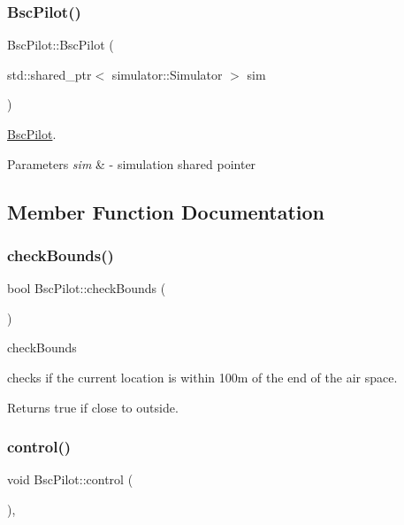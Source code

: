 \subsubsection{\texorpdfstring{Bsc\+Pilot()}{BscPilot()}}
{\footnotesize\ttfamily Bsc\+Pilot\+::\+Bsc\+Pilot (\begin{DoxyParamCaption}\item[{std\+::shared\+\_\+ptr$<$ simulator\+::\+Simulator $>$}]{sim }\end{DoxyParamCaption})}



\hyperlink{classBscPilot}{Bsc\+Pilot}. 


\begin{DoxyParams}{Parameters}
{\em sim} & -\/ simulation shared pointer \\
\hline
\end{DoxyParams}


\subsection{Member Function Documentation}
\mbox{\label{classBscPilot_a62b5a5aaec0f9359afecd77da05e3811}} 
\subsubsection{\texorpdfstring{check\+Bounds()}{checkBounds()}}
{\footnotesize\ttfamily bool Bsc\+Pilot\+::check\+Bounds (\begin{DoxyParamCaption}{ }\end{DoxyParamCaption})\hspace{0.3cm}{\ttfamily [protected]}}



check\+Bounds 

checks if the current location is within 100m of the end of the air space. \begin{DoxyReturn}{Returns}
true if close to outside. 
\end{DoxyReturn}
\mbox{\label{classBscPilot_a42240aa898a2719f14d816bbe08a0f3f}} 
\subsubsection{\texorpdfstring{control()}{control()}}
{\footnotesize\ttfamily void Bsc\+Pilot\+::control (\begin{DoxyParamCaption}{ }\end{DoxyParamCaption})\hspace{0.3cm}{\ttfamily [protected]}, {\ttfamily [virtual]}}




